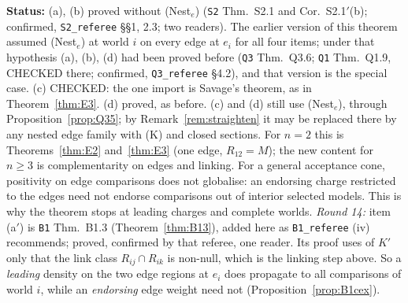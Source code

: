 \documentclass[11pt]{article}
\theoremstyle{definition}
\theoremstyle{remark}
\newcommand{\src}[1]{\texttt{#1}}
\newcommand{\status}[1]{\par\smallskip\noindent\textbf{Status:} #1\par\smallskip}
\begin{document}
\status{(a), (b) proved without (Nest$_e$) (\src{S2} Thm.~S2.1 and Cor.~S2.1$'$(b); confirmed, \src{S2\_referee} \S\S1, 2.3; two readers). The earlier version of this theorem assumed (Nest$_e$) at world $i$ on every edge at $e_i$ for all four items; under that hypothesis (a), (b), (d) had been proved before (\src{Q3} Thm.~Q3.6; \src{Q1} Thm.~Q1.9, CHECKED there; confirmed, \src{Q3\_referee} \S4.2), and that version is the special case. (c) CHECKED: the one import is Savage's theorem, as in Theorem~\ref{thm:E3}. (d) proved, as before. (c) and (d) still use (Nest$_e$), through Proposition~\ref{prop:Q35}; by Remark~\ref{rem:straighten} it may be replaced there by any nested edge family with (K) and closed sections. For $n=2$ this is Theorems~\ref{thm:E2} and~\ref{thm:E3} (one edge, $R_{12}=M$); the new content for $n\ge3$ is complementarity on edges and linking. For a general acceptance cone, positivity on edge comparisons does not globalise: an endorsing charge restricted to the edges need not endorse comparisons out of interior selected models. This is why the theorem stops at leading charges and complete worlds. \emph{Round 14:} item (a$'$) is \src{B1} Thm.~B1.3 (Theorem~\ref{thm:B13}), added here as \src{B1\_referee} (iv) recommends; proved, confirmed by that referee, one reader. Its proof uses of $K'$ only that the link class $R_{ij}\cap R_{ik}$ is non-null, which is the linking step above. So a \emph{leading} density on the two edge regions at $e_i$ does propagate to all comparisons of world $i$, while an \emph{endorsing} edge weight need not (Proposition~\ref{prop:B1cex}).}
\end{document}
